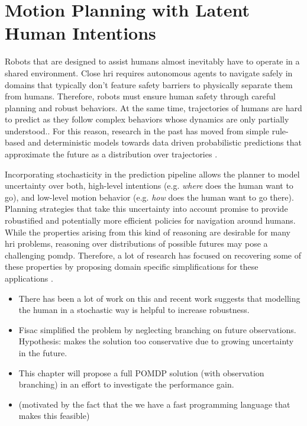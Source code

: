 \chapter{Motion Planning with Latent Human Intentions}\label{chap:hri}

Robots that are designed to assist humans almost inevitably have to operate in
a shared environment. Close \ac{hri} requires autonomous agents to navigate
safely in domains that typically don't feature safety barriers to physically
separate them from humans. Therefore, robots must ensure human safety through
careful planning and robust behaviors. At the same time, trajectories of humans
are hard to predict as they follow complex behaviors whose dynamics are only
partially understood.. For this reason, research in the past
has moved from simple rule-based and deterministic models  towards data driven probabilistic predictions that approximate the future
as a distribution over trajectories .

Incorporating stochasticity in the prediction pipeline allows the planner to
model uncertainty over both, high-level intentions (e.g. \emph{where} does the
human want to go), and low-level motion behavior (e.g. \emph{how} does the
human want to go there). Planning strategies that take this uncertainty into
account promise to provide robustified and potentially more efficient policies
for navigation around humans. While the properties arising from this kind of
reasoning are desirable for many \ac{hri} problems, reasoning over
distributions of possible futures may pose a challenging \ac{pomdp}. Therefore,
a lot of research has focused on recovering some of these properties by
proposing domain specific simplifications for these applications
\cite{fern2007decision, sadigh2016information, javdani2018shared, fisac2018probabilistically}.

\begin{itemize}
  \item There has been a lot of work on this and recent work suggests that modelling the human in a stochastic way is helpful to increase robustness. \cite{fisac2018probabilistically}
  \item Fisac simplified the problem by neglecting branching on future observations. Hypothesis: makes the solution too conservative due to growing uncertainty in the future.
  \item This chapter will propose a full POMDP solution (with observation branching) in an effort to investigate the performance gain.
  \item (motivated by the fact that the we have a fast programming language that makes this feasible)
\end{itemize}

